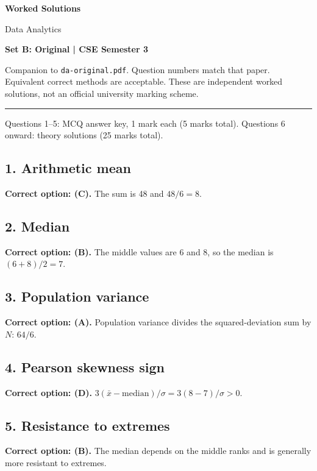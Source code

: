 \documentclass[11pt,a4paper]{article}
\begin{document}
{\LARGE\bfseries Worked Solutions}\par{\large Data Analytics}\par\textbf{Set B: Original | CSE Semester 3}\par
Companion to \texttt{da-original.pdf}. Question numbers match that paper. Equivalent correct methods are acceptable. These are independent worked solutions, not an official university marking scheme.\par\medskip\hrule\medskip
Questions 1--5: MCQ answer key, 1 mark each (5 marks total). Questions 6 onward: theory solutions (25 marks total).\par
\noindent\begin{minipage}{\linewidth}\subsection*{1. Arithmetic mean}
\textbf{Correct option: (C).} The sum is 48 and $48/6=8$.
\end{minipage}\par\medskip
\noindent\begin{minipage}{\linewidth}\subsection*{2. Median}
\textbf{Correct option: (B).} The middle values are 6 and 8, so the median is $(6+8)/2=7$.
\end{minipage}\par\medskip
\noindent\begin{minipage}{\linewidth}\subsection*{3. Population variance}
\textbf{Correct option: (A).} Population variance divides the squared-deviation sum by $N$: $64/6$.
\end{minipage}\par\medskip
\noindent\begin{minipage}{\linewidth}\subsection*{4. Pearson skewness sign}
\textbf{Correct option: (D).} $3(\bar x-\mathrm{median})/\sigma=3(8-7)/\sigma>0$.
\end{minipage}\par\medskip
\noindent\begin{minipage}{\linewidth}\subsection*{5. Resistance to extremes}
\textbf{Correct option: (B).} The median depends on the middle ranks and is generally more resistant to extremes.
\end{minipage}\par\medskip
\end{document}
